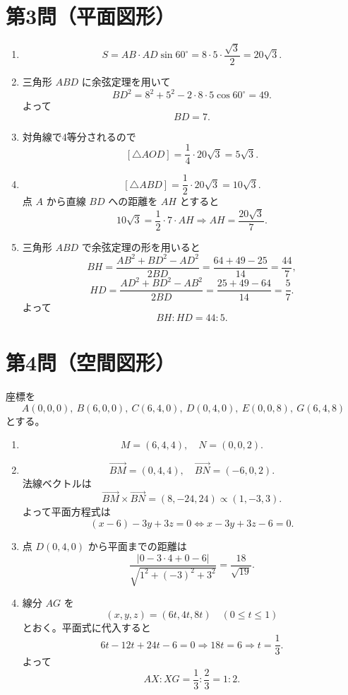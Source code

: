 \documentclass[a4paper,12pt]{jsarticle}
\begin{document}
\section*{第3問（平面図形）}
\begin{enumerate}[label=\arabic*.]
  \item
  \[
  S=AB\cdot AD\sin60^\circ=8\cdot5\cdot\frac{\sqrt3}{2}=20\sqrt3.
  \]
  \item 三角形 $ABD$ に余弦定理を用いて
  \[
  BD^2=8^2+5^2-2\cdot8\cdot5\cos60^\circ=49.
  \]
  よって
  \[
  BD=7.
  \]
  \item 対角線で4等分されるので
  \[
  [\triangle AOD]=\frac14\cdot20\sqrt3=5\sqrt3.
  \]
  \item
  \[
  [\triangle ABD]=\frac12\cdot20\sqrt3=10\sqrt3.
  \]
  点 $A$ から直線 $BD$ への距離を $AH$ とすると
  \[
  10\sqrt3=\frac12\cdot7\cdot AH
  \Rightarrow AH=\frac{20\sqrt3}{7}.
  \]
  \item 三角形 $ABD$ で余弦定理の形を用いると
  \[
  BH=\frac{AB^2+BD^2-AD^2}{2BD}=\frac{64+49-25}{14}=\frac{44}{7},
  \]
  \[
  HD=\frac{AD^2+BD^2-AB^2}{2BD}=\frac{25+49-64}{14}=\frac{5}{7}.
  \]
  よって
  \[
  BH:HD=44:5.
  \]
\end{enumerate}

\section*{第4問（空間図形）}
座標を
\[
A(0,0,0),\ B(6,0,0),\ C(6,4,0),\ D(0,4,0),\ E(0,0,8),\ G(6,4,8)
\]
とする。
\begin{enumerate}[label=\arabic*.]
  \item
  \[
  M=\left(6,4,4\right),\quad N=\left(0,0,2\right).
  \]
  \item
  \[
  \overrightarrow{BM}=(0,4,4),\quad \overrightarrow{BN}=(-6,0,2).
  \]
  法線ベクトルは
  \[
  \overrightarrow{BM}\times\overrightarrow{BN}=(8,-24,24)\propto(1,-3,3).
  \]
  よって平面方程式は
  \[
  (x-6)-3y+3z=0
  \iff x-3y+3z-6=0.
  \]
  \item 点 $D(0,4,0)$ から平面までの距離は
  \[
  \frac{|0-3\cdot4+0-6|}{\sqrt{1^2+(-3)^2+3^2}}
  =\frac{18}{\sqrt{19}}.
  \]
  \item 線分 $AG$ を
  \[
  (x,y,z)=(6t,4t,8t)\quad(0\le t\le1)
  \]
  とおく。平面式に代入すると
  \[
  6t-12t+24t-6=0
  \Rightarrow 18t=6
  \Rightarrow t=\frac13.
  \]
  よって
  \[
  AX:XG=\frac13:\frac23=1:2.
  \]
\end{enumerate}
\end{document}
